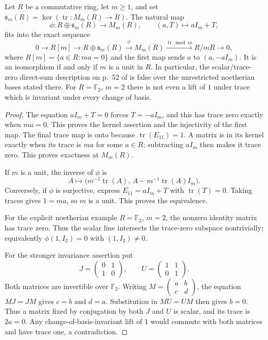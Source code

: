 \begin{lemma}\label{C:determinant-trace-splitting}
Let $R$ be a commutative ring, let $m\geq1$, and set
$\mathfrak s_m(R)=\ker(\operatorname{tr}:M_m(R)\to R)$.
The natural map
\[
 \phi:R\oplus\mathfrak s_m(R)\longrightarrow M_m(R),
       \qquad (a,T)\longmapsto aI_m+T,
\]
fits into the exact sequence
\[
 0\longrightarrow R[m]\longrightarrow
 R\oplus\mathfrak s_m(R)\xrightarrow{\phi} M_m(R)
 \xrightarrow{\operatorname{tr}\bmod m}R/mR\longrightarrow0,
\]
where $R[m]=\{a\in R:ma=0\}$ and the first map sends
$a$ to $(a,-aI_m)$.
It is an isomorphism if and only if $m$ is a unit in $R$.
In particular, the scalar/trace-zero direct-sum description on p.~52
of \cite{ROOT_KnudsenMumford1976} is false over the unrestricted
noetherian bases stated there.  For $R=\mathbb F_2$, $m=2$ there
is not even a lift of $1$ under trace which is invariant under
every change of basis.
\end{lemma}
\begin{proof}
The equation $aI_m+T=0$ forces $T=-aI_m$, and this has trace zero
exactly when $ma=0$.  This proves the kernel assertion and the
injectivity of the first map.  The final trace map is onto because
$\operatorname{tr}(E_{11})=1$.  A matrix is in its kernel exactly
when its trace is $ma$ for some $a\in R$; subtracting $aI_m$ then
makes it trace zero.  This proves exactness at $M_m(R)$.

If $m$ is a unit, the inverse of $\phi$ is
\[
 A\longmapsto
 \bigl(m^{-1}\operatorname{tr}(A),\,
       A-m^{-1}\operatorname{tr}(A)I_m\bigr).
\]
Conversely, if $\phi$ is surjective, express $E_{11}=aI_m+T$
with $\operatorname{tr}(T)=0$.  Taking traces gives $1=ma$,
so $m$ is a unit.  This proves the equivalence.

For the explicit noetherian example $R=\mathbb F_2$, $m=2$,
the nonzero identity matrix has trace zero.  Thus the scalar line
intersects the trace-zero subspace nontrivially; equivalently
$\phi(1,I_2)=0$ with $(1,I_2)\ne0$.

For the stronger invariance assertion put
\[
 J=\begin{pmatrix}0&1\\1&0\end{pmatrix},\qquad
 U=\begin{pmatrix}1&1\\0&1\end{pmatrix}.
\]
Both matrices are invertible over $\mathbb F_2$.
Writing $M=\left(\begin{smallmatrix}a&b\\c&d\end{smallmatrix}\right)$,
the equation $MJ=JM$ gives $c=b$ and $d=a$.
Substitution in $MU=UM$ then gives $b=0$.  Thus a matrix fixed by
conjugation by both $J$ and $U$ is scalar, and its trace is
$2a=0$.  Any change-of-basis-invariant lift of $1$ would commute
with both matrices and have trace one, a contradiction.
\end{proof}

